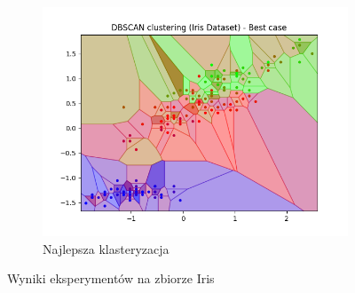 \documentclass[12pt]{article}
\begin{document}
\begin{figure}[H]
\begin{subfigure}[t]{0.19\textwidth}
        \includegraphics[width=\linewidth]{img/other_datasets/iris_dbscan_best.png}
        \caption{Najlepsza klasteryzacja}
    \end{subfigure}
    \hfill
    \caption{Wyniki eksperymentów na zbiorze Iris}
\end{figure}
\end{document}
